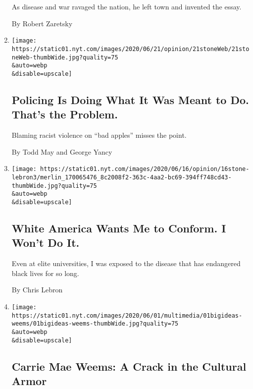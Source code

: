 \begin{enumerate}
  As disease and war ravaged the nation, he left town and invented the
  essay.

  By Robert Zaretsky
\item
  \href{/2020/06/21/opinion/police-violence-racism-reform.html}{}

  \texttt{[image: https://static01.nyt.com/images/2020/06/21/opinion/21stoneWeb/21stoneWeb-thumbWide.jpg?quality=75\\\&auto=webp\\\&disable=upscale]}

  \hypertarget{policing-is-doing-what-it-was-meant-to-do-thats-the-problem}{%
  \subsection{Policing Is Doing What It Was Meant to Do. That's the
  Problem.}\label{policing-is-doing-what-it-was-meant-to-do-thats-the-problem}}

  Blaming racist violence on ``bad apples'' misses the point.

  By Todd May and George Yancy
\item
  \href{/2020/06/16/opinion/black-academia-racism.html}{}

  \texttt{[image: https://static01.nyt.com/images/2020/06/16/opinion/16stone-lebron3/merlin\_170065476\_8c2008f2-363c-4aa2-bc69-394ff748cd43-thumbWide.jpg?quality=75\\\&auto=webp\\\&disable=upscale]}

  \hypertarget{white-america-wants-me-to-conform-i-wont-do-it}{%
  \subsection{White America Wants Me to Conform. I Won't Do
  It.}\label{white-america-wants-me-to-conform-i-wont-do-it}}

  Even at elite universities, I was exposed to the disease that has
  endangered black lives for so long.

  By Chris Lebron
\item
  \href{/2020/06/01/opinion/carrie-mae-weems-black-television.html}{}

  \texttt{[image: https://static01.nyt.com/images/2020/06/01/multimedia/01bigideas-weems/01bigideas-weems-thumbWide.jpg?quality=75\\\&auto=webp\\\&disable=upscale]}

  \hypertarget{carrie-mae-weems-a-crack-in-the-cultural-armor}{%
  \subsection{Carrie Mae Weems: A Crack in the Cultural
  Armor}\label{carrie-mae-weems-a-crack-in-the-cultural-armor}}


\end{enumerate}
